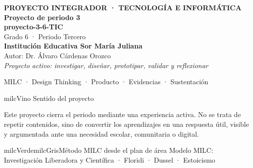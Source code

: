 \documentclass[11pt,letterpaper]{article}
\begin{document}
\thispagestyle{empty}

\vspace*{.85cm}
\begin{tcolorbox}[
  enhanced,colback=milcVino,colframe=milcVino,arc=12mm,width=.86\textwidth,
  boxrule=0pt,left=12mm,right=12mm,top=11mm,bottom=11mm,center,
  overlay={\draw[milcMagenta,line width=2pt,dash pattern=on 9pt off 8pt,rounded corners=10mm]
  ([xshift=7mm,yshift=-7mm]frame.north west) rectangle ([xshift=-7mm,yshift=7mm]frame.south east);}]
  \centering
  {\sffamily\bfseries\color{white}\fontsize{15}{17}\selectfont PROYECTO INTEGRADOR · TECNOLOGÍA E INFORMÁTICA}\\[1.0cm]
  {\sffamily\bfseries\color{white}\fontsize{30}{33}\selectfont Proyecto de periodo 3}\\[3mm]
  {\sffamily\bfseries\color{milcMostaza}\fontsize{25}{28}\selectfont proyecto-3-6-TIC}\\[8mm]
  {\sffamily\color{white}\Large Grado 6 · Periodo Tercero}\\[1.0cm]
  {\sffamily\bfseries\color{white}\large Institución Educativa Sor María Juliana}\\[2mm]
  {\sffamily\color{white}Autor: Dr. Álvaro Cárdenas Orozco}\\[4mm]
  {\sffamily\itshape\color{white}Proyecto activo: investigar, diseñar, prototipar, validar y reflexionar}
\end{tcolorbox}
\vfill
\begin{tcolorbox}[enhanced,colback=milcVino!72!black,colframe=milcVino!72!black,arc=5mm,boxrule=0pt,width=.86\textwidth,left=6mm,right=6mm,top=4mm,bottom=4mm,center]
{\color{white}\sffamily\small MILC · Design Thinking · Producto · Evidencias · Sustentación}
\end{tcolorbox}

\newpage
\begin{titlebox}{milcVino}
Sentido del proyecto
\end{titlebox}
\begin{multicols}{2}
Este proyecto cierra el periodo mediante una experiencia activa. No se trata de repetir contenidos, sino de convertir los aprendizajes en una respuesta útil, visible y argumentada ante una necesidad escolar, comunitaria o digital.

\columnbreak
\begin{softbox}{milcVerde}{milcGris}{Método MILC desde el plan de área}
Modelo MILC: Investigación Liberadora y Científica · Floridi · Dussel · Estoicismo
\end{softbox}
\end{multicols}
\end{document}
